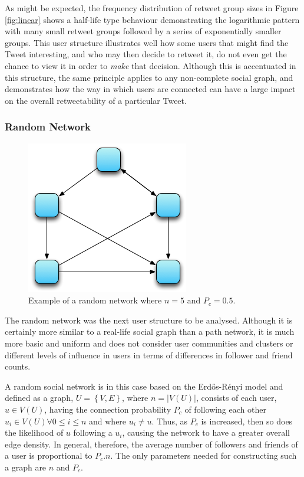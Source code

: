 As might be expected, the frequency distribution of retweet group sizes in Figure \ref{fig:linear} shows a half-life type behaviour demonstrating the logarithmic pattern with many small retweet groups followed by a series of exponentially smaller groups. This user structure illustrates well how some users that might find the Tweet interesting, and who may then decide to retweet it, do not even get the chance to view it in order to \textit{make} that decision. Although this is accentuated in this structure, the same principle applies to any non-complete social graph, and demonstrates how the way in which users are connected can have a large impact on the overall retweetability of a particular Tweet.


\subsubsection{Random Network}

\begin{figure}[h]
\centering
\includegraphics[scale=0.8]{4.Chapter2/Media/random_network.png} 
\caption{Example of a random network where $n = 5$ and $P_c = 0.5$.}
\label{fig:path_network}
\end{figure}

The random network was the next user structure to be analysed. Although it is certainly more similar to a real-life social graph than a path network, it is much more basic and uniform and does not consider user communities and clusters or different levels of influence in users in terms of differences in follower and friend counts.

A random social network is in this case based on the Erd\H{o}s-R\'{e}nyi model \cite{erdos60} and defined as a graph, $U = \left\{V,E\right\}$, where $n = |V(U)|$, consists of each user, $u \in V(U)$, having the connection probability $P_c$ of following each other $u_i \in V(U) \forall 0 \leq i \leq n$ and where $u_i \neq u$. Thus, as $P_c$ is increased, then so does the likelihood of $u$ following a $u_i$, causing the network to have a greater overall edge density. In general, therefore, the average number of followers and friends of a user is proportional to $P_c.n$. The only parameters needed for constructing such a graph are $n$ and $P_c$.

